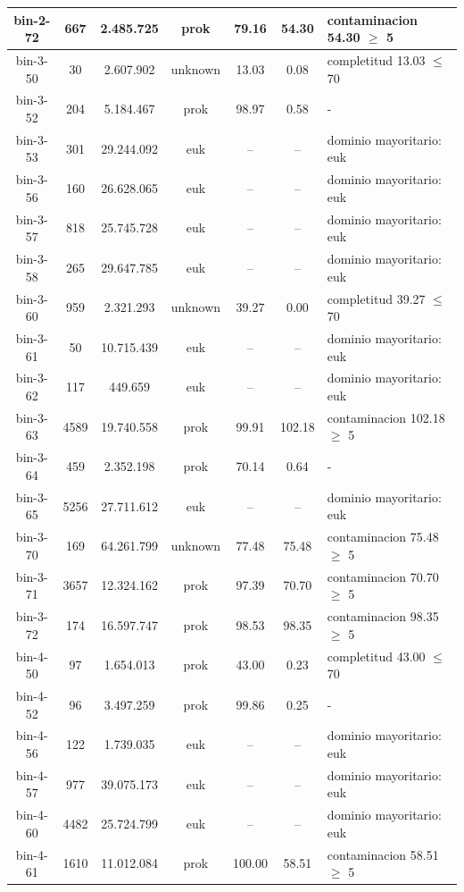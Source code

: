 \begin{xltabular}{\textwidth}{|c|c|c|c|c|c|>{\centering\arraybackslash}X|}
bin-2-72 & 667 & 2.485.725 & prok & 79.16 & 54.30 & contaminacion 54.30 $\ge$ 5 \\ \hline
bin-3-50 & 30 & 2.607.902 & unknown & 13.03 & 0.08 & completitud 13.03 $\le$ 70 \\ \hline
bin-3-52 & 204 & 5.184.467 & prok & 98.97 & 0.58 & - \\ \hline
bin-3-53 & 301 & 29.244.092 & euk & -- & -- & dominio mayoritario: euk \\ \hline
bin-3-56 & 160 & 26.628.065 & euk & -- & -- & dominio mayoritario: euk \\ \hline
bin-3-57 & 818 & 25.745.728 & euk & -- & -- & dominio mayoritario: euk \\ \hline
bin-3-58 & 265 & 29.647.785 & euk & -- & -- & dominio mayoritario: euk \\ \hline
bin-3-60 & 959 & 2.321.293 & unknown & 39.27 & 0.00 & completitud 39.27 $\le$ 70 \\ \hline
bin-3-61 & 50 & 10.715.439 & euk & -- & -- & dominio mayoritario: euk \\ \hline
bin-3-62 & 117 & 449.659 & euk & -- & -- & dominio mayoritario: euk \\ \hline
bin-3-63 & 4589 & 19.740.558 & prok & 99.91 & 102.18 & contaminacion 102.18 $\ge$ 5 \\ \hline
bin-3-64 & 459 & 2.352.198 & prok & 70.14 & 0.64 & - \\ \hline
bin-3-65 & 5256 & 27.711.612 & euk & -- & -- & dominio mayoritario: euk \\ \hline
bin-3-70 & 169 & 64.261.799 & unknown & 77.48 & 75.48 & contaminacion 75.48 $\ge$ 5 \\ \hline
bin-3-71 & 3657 & 12.324.162 & prok & 97.39 & 70.70 & contaminacion 70.70 $\ge$ 5 \\ \hline
bin-3-72 & 174 & 16.597.747 & prok & 98.53 & 98.35 & contaminacion 98.35 $\ge$ 5 \\ \hline
bin-4-50 & 97 & 1.654.013 & prok & 43.00 & 0.23 & completitud 43.00 $\le$ 70 \\ \hline
bin-4-52 & 96 & 3.497.259 & prok & 99.86 & 0.25 & - \\ \hline
bin-4-56 & 122 & 1.739.035 & euk & -- & -- & dominio mayoritario: euk \\ \hline
bin-4-57 & 977 & 39.075.173 & euk & -- & -- & dominio mayoritario: euk \\ \hline
bin-4-60 & 4482 & 25.724.799 & euk & -- & -- & dominio mayoritario: euk \\ \hline
bin-4-61 & 1610 & 11.012.084 & prok & 100.00 & 58.51 & contaminacion 58.51 $\ge$ 5 \\ \hline

\end{xltabular}
